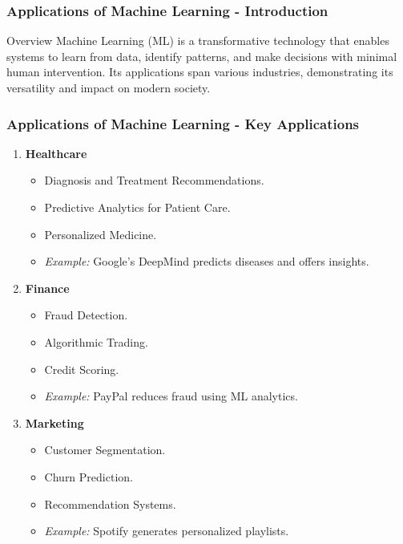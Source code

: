 \documentclass[aspectratio=169]{beamer}
\begin{document}
\begin{frame}[fragile]
    \frametitle{Applications of Machine Learning - Introduction}
    \begin{block}{Overview}
        Machine Learning (ML) is a transformative technology that enables systems to learn from data, identify patterns, and make decisions with minimal human intervention. Its applications span various industries, demonstrating its versatility and impact on modern society.
    \end{block}
\end{frame}

\begin{frame}[fragile]
    \frametitle{Applications of Machine Learning - Key Applications}
    \begin{enumerate}
        \item \textbf{Healthcare}
            \begin{itemize}
                \item Diagnosis and Treatment Recommendations.
                \item Predictive Analytics for Patient Care.
                \item Personalized Medicine.
                \item \textit{Example:} Google's DeepMind predicts diseases and offers insights.
            \end{itemize}
        \item \textbf{Finance}
            \begin{itemize}
                \item Fraud Detection.
                \item Algorithmic Trading.
                \item Credit Scoring.
                \item \textit{Example:} PayPal reduces fraud using ML analytics.
            \end{itemize}
        \item \textbf{Marketing}
            \begin{itemize}
                \item Customer Segmentation.
                \item Churn Prediction.
                \item Recommendation Systems.
                \item \textit{Example:} Spotify generates personalized playlists.
            \end{itemize}
    \end{enumerate}
\end{frame}
\end{document}
